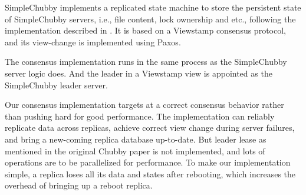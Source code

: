 SimpleChubby implements a replicated state machine to store the persistent
state of SimpleChubby servers, i.e., file content, lock ownership and etc.,
following the implementation described in \cite{mazieres2007paxos}.
It is based on a Viewstamp consensus protocol\cite{oki1988viewstamped},
and its view-change is implemented using Paxos\cite{lamport2001paxos}.

The consensus implementation runs in the same process
as the SimpleChubby server logic does.
And the leader in a Viewstamp view is appointed as the SimpleChubby leader server.

Our consensus implementation targets at a correct consensus behavior
rather than pushing hard for good performance.
The implementation can reliably replicate data across replicas,
achieve correct view change during server failures,
and bring a new-coming replica database up-to-date.
But leader lease as mentioned in the original Chubby paper is
not implemented,
and lots of operations are to be parallelized for performance.
To make our implementation simple,
a replica loses all its data and states after rebooting,
which increases the overhead of bringing up a reboot replica.

%
%
%
%
